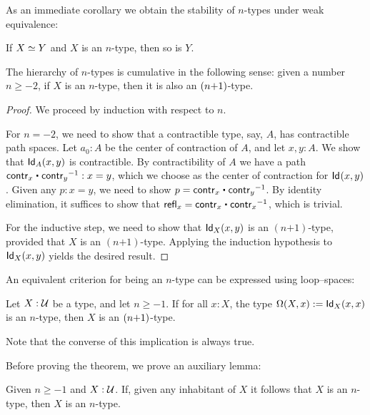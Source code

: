 As an immediate corollary we obtain the stability of $n$-types under weak equivalence:

\begin{cor}\label{cor:preservation_hlevels_weq}
 If $\eqv{X}{Y}$ and $X$ is an $n$-type, then so is $Y$.
\end{cor}

\begin{thm}\label{thm:hlevel_cumulative}
 The hierarchy of $n$-types is cumulative in the following sense:
   given a number $n \geq -2$, if $X$ is an $n$-type, then it is also an $(n\mbox{\rm{+}}1)$-type.
\end{thm}

\begin{proof}
 We proceed by induction with respect to $n$.

 For $n = -2$, we need to show that a contractible type, say, $A$, has contractible path spaces.
       Let $a_0: A$ be the center of contraction of $A$, and let $x, y : A$. We show that $\idtype[A]{x}{y}$
       is contractible.
       By contractibility of $A$ we have a path $\contr_x \ct \opp{\contr_y} : x = y$, which we choose as
       the center of contraction for $\idtype{x}{y}$.
       Given any $p : x = y$, we need to show $p = \contr_x \ct \opp{\contr_y}$.
           By identity elimination, it suffices to show that
        $\refl{x} = \contr_x \ct \opp{\contr_x}$, which is trivial.

 For the inductive step, we need to show that $\idtype[X]{x}{y}$ is an $(n\mbox{+}1)$-type, provided
          that $X$ is an $(n\mbox{+}1)$-type. Applying the induction hypothesis to $\idtype[X]{x}{y}$
         yields the desired result.
\end{proof}

An equivalent criterion for being an $n$-type can be expressed using loop--spaces:

\begin{thm}\label{thm:hlevel_loops}
 Let $X : \type$ be a type, and let $n\geq -1$.
  If for all $x : X$, the type $\Omega(X, x) := \idtype[X]{x}{x}$ is an $n$-type,
       then $X$ is an $(n\mbox{\rm{+}}1)$-type.
\end{thm}

Note that the converse of this implication is always true.

Before proving the theorem, we prove an auxiliary lemma:

\begin{lem}\label{lem:hlevel_if_inhab_hlevel}
 Given $n \geq -1$ and $X : \type$. If, given any inhabitant of $X$ it follows that $X$ is
   an $n$-type, then $X$ is an $n$-type.
\end{lem}

